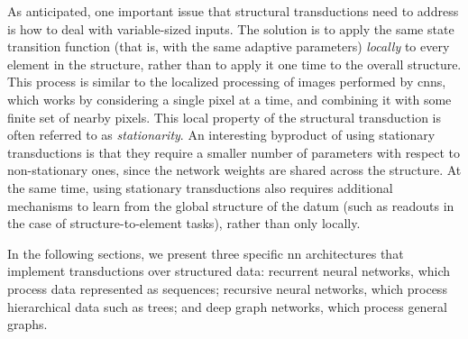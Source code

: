 As anticipated, one important issue that structural transductions need to address is how to deal with variable-sized inputs. The solution is to apply the same state transition function (that is, with the same adaptive parameters) \emph{locally} to every element in the structure, rather than to apply it one time to the overall structure. This process is similar to the localized processing of images performed by \glspl{cnn}, which works by considering a single pixel at a time, and combining it with some finite set of nearby pixels. This local property of the structural transduction is often referred to as \emph{stationarity}. An interesting byproduct of using stationary transductions is that they require a smaller number of parameters with respect to non-stationary ones, since the network weights are shared across the structure. At the same time, using stationary transductions also requires additional mechanisms to learn from the global structure of the datum (such as readouts in the case of structure-to-element tasks), rather than only locally.

In the following sections, we present three specific \gls{nn} architectures that implement transductions over structured data: recurrent neural networks, which process data represented as sequences; recursive neural networks, which process hierarchical data such as trees; and deep graph networks, which process general graphs.

